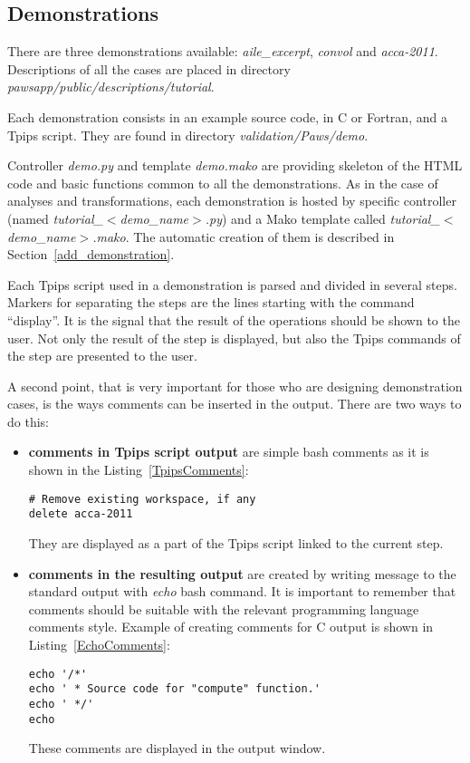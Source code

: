 \subsection{Demonstrations}

There are three demonstrations available: \emph{aile\_excerpt},
\emph{convol} and \emph{acca-2011}. Descriptions of all the cases are
placed in directory \emph{pawsapp/public/descriptions/tutorial}.

Each demonstration consists in an example source code, in C or
Fortran, and a Tpips script. They are found in
directory \emph{validation/Paws/demo}.

Controller \emph{demo.py} and template \emph{demo.mako} are providing
skeleton of the HTML code and basic functions common to all the
demonstrations. As in the case of analyses and transformations, each
demonstration is hosted by specific controller (named
\emph{tutorial\_$<$demo\_name$>$.py}) and a Mako template called
\emph{tutorial\_$<$demo\_name$>$.mako}. The automatic creation of
them is described in Section~\ref{add_demonstration}.

Each Tpips script used in a demonstration is parsed and divided in
several steps. Markers for separating the steps are the lines starting
with the command ``display''. It is the signal that the result of the
operations should be shown to the user. Not only the result of the step is
displayed, but also the Tpips commands of the step are presented to
the user.

A second point, that is very important for those who are designing
demonstration cases, is the ways comments can be inserted in the
output. There are two ways to do this:

\begin{itemize}
\item {\bf comments in Tpips script output} are simple bash comments
  as it is shown in the Listing~\ref{TpipsComments}:
  
  \begin{lstlisting}
# Remove existing workspace, if any
delete acca-2011
  \end{lstlisting}
  
  They are displayed as a part of the Tpips script linked to the current step.
  
\item {\bf comments in the resulting output} are created by writing
  message to the standard output with \emph{echo}\cite{echo}
  bash\cite{bash} command. It is important to remember that comments
  should be suitable with the relevant programming language comments
  style. Example of creating comments for C output is shown in
  Listing~\ref{EchoComments}:
    
  \begin{lstlisting}
echo '/*'
echo ' * Source code for "compute" function.'
echo ' */'
echo
  \end{lstlisting}
  
  These comments are displayed in the output window.
  
\end{itemize}

